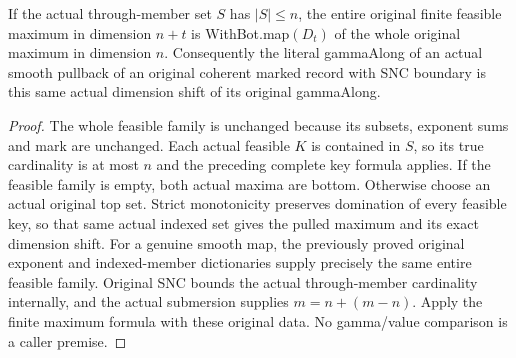 \begin{theorem}
\label{hir:smooth-actual-value-whole-gamma-dimension}
\leanok
{}
If the actual through-member set $S$ has $|S|\le n$, the entire original
finite feasible maximum in dimension $n+t$ is WithBot.map$(D_t)$ of the
whole original maximum in dimension $n$. Consequently the literal gammaAlong
of an actual smooth pullback of an original coherent marked record with
SNC boundary is this same actual dimension shift of its original gammaAlong.
\end{theorem}
\begin{proof}
The whole feasible family is unchanged because its subsets, exponent sums
and mark are unchanged. Each actual feasible $K$ is contained in $S$,
so its true cardinality is at most $n$ and the preceding complete key
formula applies. If the feasible family is empty, both actual maxima are
bottom. Otherwise choose an actual original top set. Strict monotonicity
preserves domination of every feasible key, so that same actual indexed
set gives the pulled maximum and its exact dimension shift. For a genuine
smooth map, the previously proved original exponent and indexed-member
dictionaries supply precisely the same entire feasible family. Original
SNC bounds the actual through-member cardinality internally, and the actual
submersion supplies $m=n+(m-n)$. Apply the finite maximum formula with
these original data. No gamma/value comparison is a caller premise.
\end{proof}

